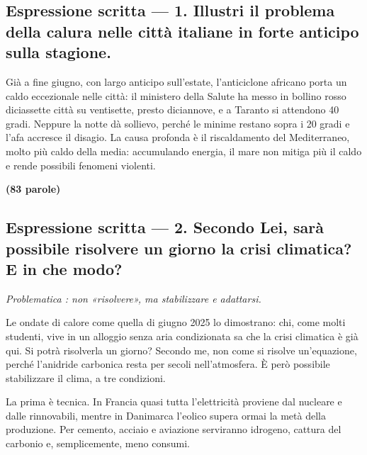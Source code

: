 \documentclass[11pt,a4paper]{article}
\begin{document}
\hypertarget{espressione-scritta-1.-illustri-il-problema-della-calura-nelle-cittuxe0-italiane-in-forte-anticipo-sulla-stagione.}{%
\subsection{Espressione scritta --- 1. Illustri il problema della calura nelle città italiane in forte anticipo sulla stagione.}\label{espressione-scritta-1.-illustri-il-problema-della-calura-nelle-cittuxe0-italiane-in-forte-anticipo-sulla-stagione.}}

Già a fine giugno, con largo anticipo sull'estate, l'anticiclone africano porta un caldo eccezionale nelle città: il ministero della Salute ha messo in bollino rosso diciassette città su ventisette, presto diciannove, e a Taranto si attendono 40 gradi. Neppure la notte dà sollievo, perché le minime restano sopra i 20 gradi e l'afa accresce il disagio. La causa profonda è il riscaldamento del Mediterraneo, molto più caldo della media: accumulando energia, il mare non mitiga più il caldo e rende possibili fenomeni violenti.

\textbf{(83 parole)}

\hypertarget{espressione-scritta-2.-secondo-lei-saruxe0-possibile-risolvere-un-giorno-la-crisi-climatica-e-in-che-modo}{%
\subsection{Espressione scritta --- 2. Secondo Lei, sarà possibile risolvere un giorno la crisi climatica? E in che modo?}\label{espressione-scritta-2.-secondo-lei-saruxe0-possibile-risolvere-un-giorno-la-crisi-climatica-e-in-che-modo}}

\emph{Problematica : non «risolvere», ma stabilizzare e adattarsi.}

Le ondate di calore come quella di giugno 2025 lo dimostrano: chi, come molti studenti, vive in un alloggio senza aria condizionata sa che la crisi climatica è già qui. Si potrà risolverla un giorno? Secondo me, non come si risolve un'equazione, perché l'anidride carbonica resta per secoli nell'atmosfera. È però possibile stabilizzare il clima, a tre condizioni.

La prima è tecnica. In Francia quasi tutta l'elettricità proviene dal nucleare e dalle rinnovabili, mentre in Danimarca l'eolico supera ormai la metà della produzione. Per cemento, acciaio e aviazione serviranno idrogeno, cattura del carbonio e, semplicemente, meno consumi.
\end{document}
